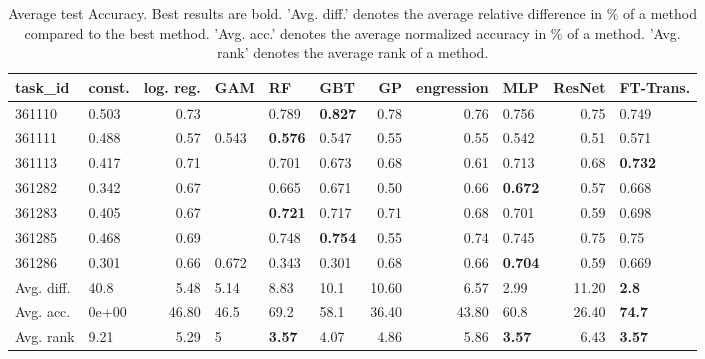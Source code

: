 \begin{table}[ht!]
\centering
\begingroup\footnotesize
\begin{tabular}{llrlllrrlrl}
  \hline
\hline
task\_id & const. & log. reg. & GAM & RF & GBT & GP & engression & MLP & ResNet & FT-Trans. \\ 
  \hline
361110 & 0.503 & 0.73 &  & 0.789 & \textbf{0.827} & 0.78 & 0.76 & 0.756 & 0.75 & 0.749 \\ 
  361111 & 0.488 & 0.57 & 0.543 & \textbf{0.576} & 0.547 & 0.55 & 0.55 & 0.542 & 0.51 & 0.571 \\ 
  361113 & 0.417 & 0.71 &  & 0.701 & 0.673 & 0.68 & 0.61 & 0.713 & 0.68 & \textbf{0.732} \\ 
  361282 & 0.342 & 0.67 &  & 0.665 & 0.671 & 0.50 & 0.66 & \textbf{0.672} & 0.57 & 0.668 \\ 
  361283 & 0.405 & 0.67 &  & \textbf{0.721} & 0.717 & 0.71 & 0.68 & 0.701 & 0.59 & 0.698 \\ 
  361285 & 0.468 & 0.69 &  & 0.748 & \textbf{0.754} & 0.55 & 0.74 & 0.745 & 0.75 & 0.75 \\ 
  361286 & 0.301 & 0.66 & 0.672 & 0.343 & 0.301 & 0.68 & 0.66 & \textbf{0.704} & 0.59 & 0.669 \\ 
   \hline
Avg. diff. & 40.8 & 5.48 & 5.14 & 8.83 & 10.1 & 10.60 & 6.57 & 2.99 & 11.20 & \textbf{2.8} \\ 
  Avg. acc. & 0e+00 & 46.80 & 46.5 & 69.2 & 58.1 & 36.40 & 43.80 & 60.8 & 26.40 & \textbf{74.7} \\ 
  Avg. rank & 9.21 & 5.29 & 5 & \textbf{3.57} & 4.07 & 4.86 & 5.86 & \textbf{3.57} & 6.43 & \textbf{3.57} \\ 
   \hline
\hline
\end{tabular}
\endgroup
\caption{Average test Accuracy. 
                  Best results are bold. 
                  'Avg. diff.' denotes the average relative difference in \% of a method compared to the best method.
                  'Avg. acc.' denotes the average normalized accuracy in \% of a method.
                  'Avg. rank' denotes the average rank of a method.} 
\label{TABLES/table_results_Accuracy_umap_num_and_cat_features}
\end{table}

